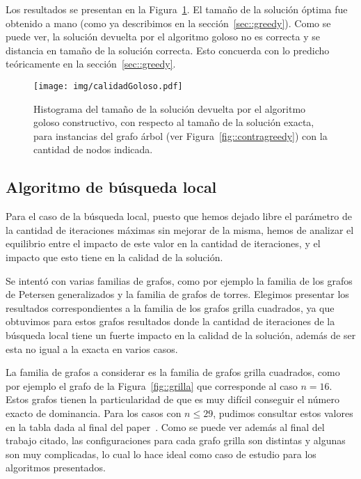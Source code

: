 Los resultados se presentan en la Figura~\ref{fig::calidadGoloso}. El 
tama\~no de la soluci\'on \'optima fue obtenido a mano (como ya 
describimos en la secci\'on~\ref{sec::greedy}). Como se puede ver, la 
soluci\'on devuelta por el algoritmo goloso no es correcta y se 
distancia en tama\~no de la soluci\'on correcta. 
Esto concuerda con lo predicho te\'oricamente en la secci\'on~\ref{sec::greedy}.

\begin{figure}[H]
	\caption{Histograma del tama\~no de la soluci\'on devuelta por el
	algoritmo goloso constructivo, con respecto al tama\~no de la
	soluci\'on exacta, para instancias del grafo \'arbol 
	(ver Figura~\ref{fig::contragreedy}) con la cantidad de nodos 
	indicada.}
	\label{fig::calidadGoloso}
	\centering
	\texttt{[image: img/calidadGoloso.pdf]}
\end{figure} 

\subsection{Algoritmo de b\'usqueda local}

Para el caso de la b\'usqueda local, puesto que hemos dejado libre el 
par\'ametro de la cantidad de iteraciones m\'aximas sin mejorar de la 
misma, hemos de analizar el equilibrio entre el impacto de este valor
en la cantidad de iteraciones, y el impacto que esto tiene en la 
calidad de la soluci\'on.

Se intent\'o con varias familias de grafos, como por ejemplo la familia
de los grafos de Petersen generalizados y la familia de grafos de torres.
Elegimos presentar los resultados correspondientes a la familia de los
grafos grilla cuadrados, ya que obtuvimos para estos grafos resultados 
donde la cantidad de iteraciones de la b\'usqueda local tiene un 
fuerte impacto en la calidad de la soluci\'on, adem\'as de ser esta no 
igual a la exacta en varios casos.

La familia de grafos a considerar es la familia de grafos grilla 
cuadrados, como por ejemplo el grafo de la Figura~\ref{fig::grilla}
que corresponde al caso $n = 16$. Estos grafos tienen la particularidad
de que es muy dif\'icil conseguir el n\'umero exacto de dominancia. 
Para los casos con $n \leq 29$, pudimos consultar estos valores en la
tabla dada al final del paper~\cite{gridgraphs}. Como se puede ver
adem\'as al final del trabajo citado, las configuraciones para cada
grafo grilla son distintas y algunas son muy complicadas, lo cual lo
hace ideal como caso de estudio para los algoritmos presentados.

